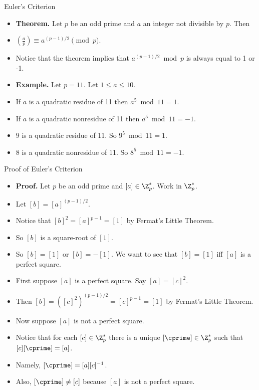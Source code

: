 \documentclass[handout]{beamer}
\begin{document}
\begin{frame}{Euler's Criterion}

\begin{itemize}
  \item \textbf{Theorem.} Let $p$ be an odd prime and $a$ an integer not divisible by $p$. Then
  \item $(\frac{a}{p}) \equiv a^{(p-1)/2} \pmod p$.
  \item Notice that the theorem implies that $a^{(p-1)/2} \bmod p$ is always equal to 1 or -1.
  \item \textbf{Example.} Let $p=11$. Let $1\leq a \leq 10$.
  \item If $a$ is a quadratic residue of 11 then $a^5 \bmod 11 = 1$.
  \item If $a$ is a quadratic nonresidue of 11 then $a^5 \bmod 11 = -1$.
  \item $9$ is a quadratic residue of 11. So $9^5 \bmod 11 = 1$.
  \item $8$ is a quadratic nonresidue of 11. So $8^5 \bmod 11 = -1$.
\end{itemize}

\end{frame}


\begin{frame}{Proof of Euler's Criterion}

\begin{itemize}
  \item \textbf{Proof.} Let $p$ be an odd prime and $[a]\in\Z^*_p$. Work in $\Z^*_p$.
  \item Let $[b]=[a]^{(p-1)/2}$.
  \item Notice that $[b]^2 = [a]^{p-1} = [1]$ by Fermat's Little Theorem.
  \item So $[b]$ is a square-root of $[1]$.
  \item So $[b] = [1]$ or $[b] = -[1]$. We want to see that $[b]=[1]$ iff $[a]$ is a perfect square.
  \item First suppose $[a]$ is a perfect square. Say $[a] = [c]^2$.
  \item Then $[b]= ([c]^2)^{(p-1)/2}=[c]^{p-1}=[1]$ by Fermat's Little Theorem.
  \item Now suppose $[a]$ is not a perfect square.
  \item Notice that for each $[c]\in\Z^*_p$ there is a unique $[\cprime]\in\Z^*_p$ such that $[c][\cprime] = [a]$.
  \item Namely, $[\cprime] = [a][c]^{-1}$.
  \item Also, $[\cprime]\not= [c]$ because $[a]$ is not a perfect square.
\end{itemize}

\end{frame}
\end{document}
